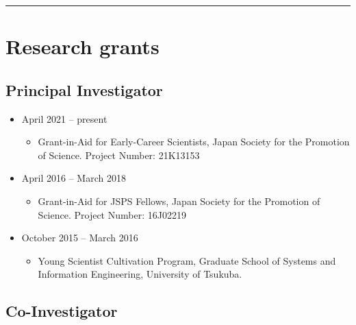 \documentclass[]{book}
\providecommand{\tightlist}{%
  \setlength{\itemsep}{0pt}\setlength{\parskip}{0pt}}
\begin{document}
\begin{center}\rule{0.5\linewidth}{0.5pt}\end{center}

\hypertarget{research-grants}{%
\section*{Research grants}\label{research-grants}}

\hypertarget{principal-investigator}{%
\subsection*{Principal Investigator}\label{principal-investigator}}

\begin{itemize}
\tightlist
\item
  April 2021 -- present

  \begin{itemize}
  \tightlist
  \item
    Grant-in-Aid for Early-Career Scientists,
    Japan Society for the Promotion of Science.
    Project Number: 21K13153
  \end{itemize}
\item
  April 2016 -- March 2018

  \begin{itemize}
  \tightlist
  \item
    Grant-in-Aid for JSPS Fellows,
    Japan Society for the Promotion of Science.
    Project Number: 16J02219
  \end{itemize}
\item
  October 2015 -- March 2016

  \begin{itemize}
  \tightlist
  \item
    Young Scientist Cultivation Program,
    Graduate School of Systems and Information Engineering, University of Tsukuba.
  \end{itemize}
\end{itemize}

\hypertarget{co-investigator}{%
\subsection*{Co-Investigator}\label{co-investigator}}
\end{document}
